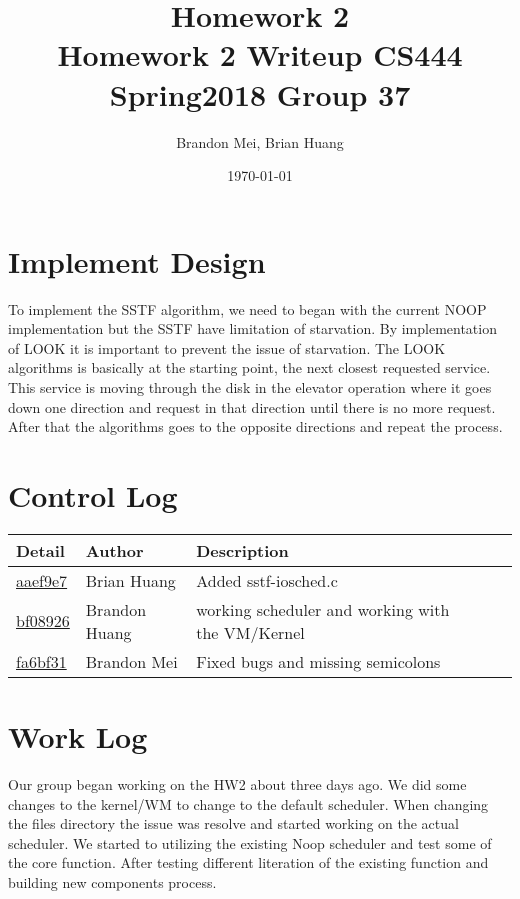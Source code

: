 \documentclass[onecolumn, draftclsnofoot, 10pt, titlepage, compsoc]{IEEEtran}
\title
{%
	Homework 2 \\
	\vspace{0.4cm}
	\large Homework 2 Writeup
	\vspace{0.4cm}
	\large CS444 Spring2018 Group 37
}
\author{Brandon Mei, Brian Huang}
\date{\today}
\begin{document}
\maketitle

\newpage

\section{Implement Design}
To implement the SSTF algorithm, we need to began with the current NOOP implementation but the SSTF have limitation of starvation. By implementation of LOOK it is important to prevent the issue of starvation. The LOOK algorithms is basically at the starting point, the next closest requested service. This service is moving through the disk in the elevator operation where it goes down one direction and request in that direction until there is no more request. After that the algorithms goes to the opposite directions and repeat the process. 


\section{Control Log}

\begin{tabular}{l p{5cm} l p{5cm} l}
\textbf{Detail} & \textbf{Author} & \textbf{Description}\\
\hline
\href{https://github.com/BrandonMei/Operating-Systems-II/commit/aaef9e725639e20f2b7e841b093672727c2aee89}{aaef9e7} & Brian Huang & Added sstf-iosched.c\\
\hline
\href{https://github.com/BrandonMei/Operating-Systems-II/commit/bf08926acbfda4487f7615dd97da3d7c6eb5609b}{bf08926} & Brandon Huang & working scheduler and working with the VM/Kernel\\
\hline
\href{https://github.com/BrandonMei/Operating-Systems-II/commit/fa6bf313ea5a4a25f373ba5bd3e1a0f8e8bbe64c}{fa6bf31} & Brandon Mei & Fixed bugs and missing semicolons\\
\hline
\end{tabular}

\section{Work Log}
Our group began working on the HW2  about three days ago. We did some changes to the kernel/WM to change to the default scheduler. When changing the files directory the issue was resolve and started working on the actual scheduler. We started to utilizing the existing Noop scheduler and test some of the core function. After testing different literation of the existing function and building new components process. 
\end{document}
